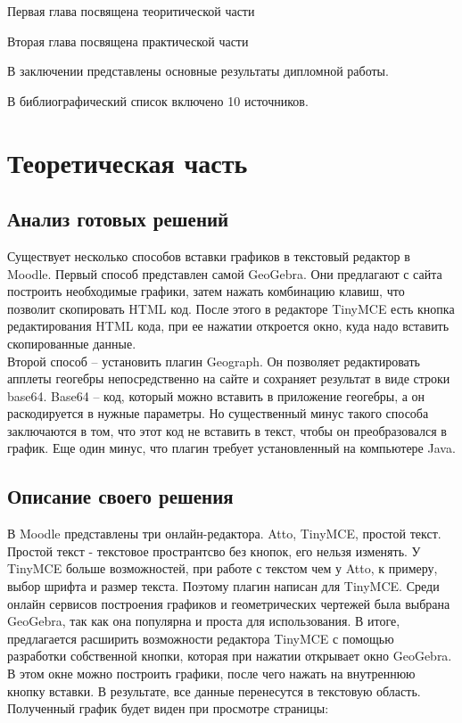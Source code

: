\documentclass[14pt,Diplom]{diplomwork}
\begin{document}
Первая глава посвящена теоритической части

Вторая глава посвящена практической части


В заключении представлены основные результаты дипломной работы.

В библиографический список включено 10 источников.



\chapter{Теоретическая часть}

\section{Анализ готовых решений}

Существует несколько способов вставки графиков в текстовый редактор в Moodle. Первый способ представлен самой GeoGebra. Они предлагают с сайта построить необходимые графики, затем нажать комбинацию клавиш, что позволит скопировать HTML код. После этого в редакторе TinyMCE есть кнопка редактирования HTML кода, при ее нажатии откроется окно, куда надо вставить скопированные данные.\\
Второй способ – установить плагин Geograph. Он позволяет редактировать апплеты геогебры непосредственно на сайте и сохраняет результат в виде строки base64. Base64 – код, который можно вставить в приложение геогебры, а он раскодируется в нужные параметры. Но существенный минус такого способа заключаются в том, что этот код не вставить в текст, чтобы он преобразовался в график. Еще один минус, что плагин требует установленный на компьютере Java.

\section{Описание своего решения}

В Moodle представлены три онлайн-редактора. Atto, TinyMCE, простой текст. Простой текст - текстовое пространтсво без кнопок, его нельзя изменять. У TinyMCE больше возможностей, при работе с текстом чем у Atto, к примеру, выбор шрифта и размер текста. Поэтому плагин написан для TinyMCE. Среди онлайн сервисов построения графиков и геометрических чертежей была выбрана GeoGebra, так как она популярна и проста для использования. В итоге, предлагается расширить возможности редактора TinyMCE с помощью разработки собственной кнопки, которая при нажатии открывает окно GeoGebra. В этом окне можно построить графики, после чего нажать на внутреннюю кнопку вставки. В результате, все данные перенесутся в текстовую область. Полученный график будет виден при просмотре страницы:
\end{document}

